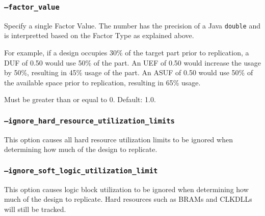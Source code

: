 \subsubsection{\texttt{--factor\_value}}
Specify a single Factor Value.  The number has the precision of a Java 
\texttt{double} and is interpretted based on the Factor Type as explained above.

For example, if a design occupies 30\% of the target part prior to replication,
a DUF of 0.50 would use 50\% of the part. An UEF of 0.50 would increase the
usage by 50\%, resulting in 45\% usage of the part. An ASUF of 0.50 would use
50\% of the available space prior to replication, resulting in 65\% usage.

Must be greater than or equal to 0. Default: 1.0.

\subsubsection{\texttt{--ignore\_hard\_resource\_utilization\_limits}}
This option causes all hard resource utilization limits to be ignored when
determining how much of the design to replicate.

\subsubsection{\texttt{--ignore\_soft\_logic\_utilization\_limit}}
This option causes logic block utilization to be ignored when
determining how much of the design to replicate. Hard resources such as BRAMs
and CLKDLLs will still be tracked.





